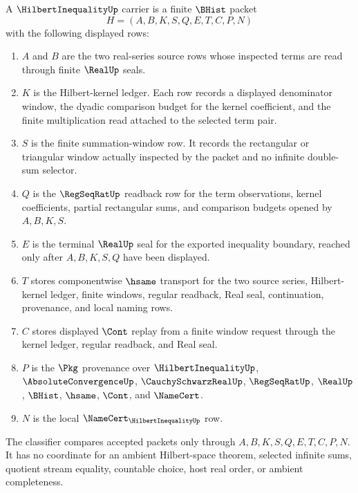 \begin{definition}
\label{def:hilbert-inequality-carrier}
A $\HilbertInequalityUp$ carrier is a finite $\BHist$ packet
$$
H=(A,B,K,S,Q,E,T,C,P,N)
$$
with the following displayed rows:
\begin{enumerate}
\item $A$ and $B$ are the two real-series source rows whose inspected terms are read through finite $\RealUp$ seals.
\item $K$ is the Hilbert-kernel ledger. Each row records a displayed denominator window, the dyadic comparison budget for the kernel coefficient, and the finite multiplication read attached to the selected term pair.
\item $S$ is the finite summation-window row. It records the rectangular or triangular window actually inspected by the packet and no infinite double-sum selector.
\item $Q$ is the $\RegSeqRatUp$ readback row for the term observations, kernel coefficients, partial rectangular sums, and comparison budgets opened by $A,B,K,S$.
\item $E$ is the terminal $\RealUp$ seal for the exported inequality boundary, reached only after $A,B,K,S,Q$ have been displayed.
\item $T$ stores componentwise $\hsame$ transport for the two source series, Hilbert-kernel ledger, finite windows, regular readback, Real seal, continuation, provenance, and local naming rows.
\item $C$ stores displayed $\Cont$ replay from a finite window request through the kernel ledger, regular readback, and Real seal.
\item $P$ is the $\Pkg$ provenance over $\HilbertInequalityUp$, $\AbsoluteConvergenceUp$, $\CauchySchwarzRealUp$, $\RegSeqRatUp$, $\RealUp$, $\BHist$, $\hsame$, $\Cont$, and $\NameCert$.
\item $N$ is the local $\NameCert_{\HilbertInequalityUp}$ row.
\end{enumerate}
The classifier compares accepted packets only through $A,B,K,S,Q,E,T,C,P,N$. It has no coordinate for an ambient Hilbert-space theorem, selected infinite sums, quotient stream equality, countable choice, host real order, or ambient completeness.
\end{definition}

